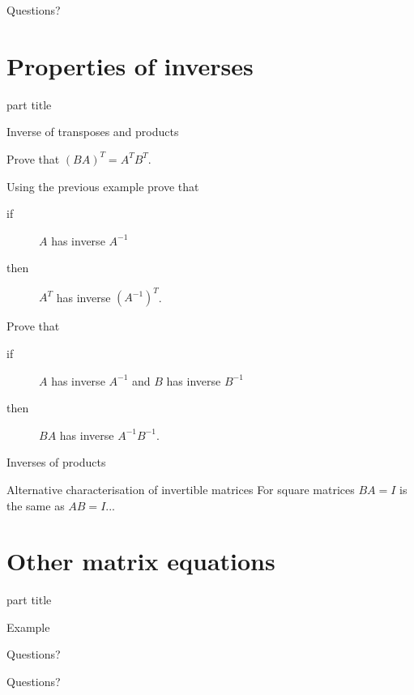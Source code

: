 \documentclass{beamer}
\begin{document}
\begin{frame}
  Questions?
\end{frame}

\section{Properties of inverses}

\begin{frame}
  \begin{beamercolorbox}[sep=12pt,center]{part title}
    \insertsection\par
  \end{beamercolorbox}
\end{frame}

\begin{frame}{Inverse of transposes and products}
  \begin{example}
    Prove that $(BA)^T = A^T B^T$.
  \end{example}\vfill
  \begin{example}
    Using the previous example prove that
    \begin{description}
    \item [if] $A$ has inverse $A^{-1}$
    \item [then] $A^T$ has inverse $(A^{-1})^T$.
    \end{description}
  \end{example}\vfill
  \begin{example}
    Prove that
    \begin{description}
    \item [if] $A$ has inverse $A^{-1}$ and $B$ has inverse $B^{-1}$
    \item [then] $BA$ has inverse $A^{-1}B^{-1}$.
    \end{description}
  \end{example}
\end{frame}

\begin{frame}{Inverses of products}
  
\end{frame}

\begin{frame}{Alternative characterisation of invertible matrices}
  For square matrices $BA=I$ is the same as $AB=I$...
\end{frame}

\section{Other matrix equations}

\begin{frame}
  \begin{beamercolorbox}[sep=12pt,center]{part title}
    \insertsection\par
  \end{beamercolorbox}
\end{frame}

\begin{frame}{Example}
  
\end{frame}

\begin{frame}
  Questions?
\end{frame}

\begin{frame}
  Questions?
\end{frame}
\end{document}
